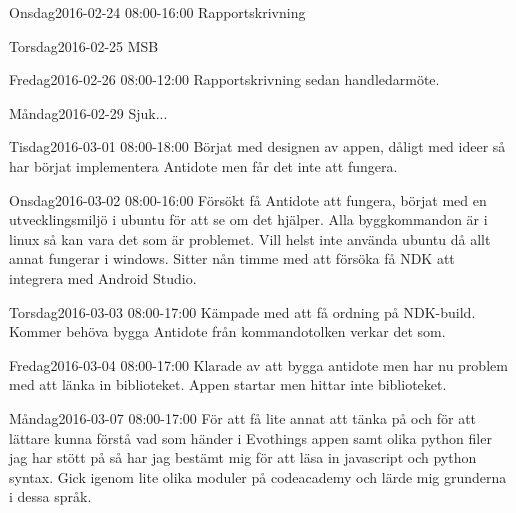 \documentclass[a4paper,oneside]{book}
\begin{document}
\begin{diary}{Onsdag}{2016-02-24 08:00-16:00}
	Rapportskrivning
\end{diary}

\begin{diary}{Torsdag}{2016-02-25}
	MSB
\end{diary}

\begin{diary}{Fredag}{2016-02-26 08:00-12:00}
	Rapportskrivning sedan handledarmöte.
\end{diary}
\newpage

\begin{diary}{Måndag}{2016-02-29}
	Sjuk...
\end{diary}

\begin{diary}{Tisdag}{2016-03-01 08:00-18:00}
	Börjat med designen av appen, dåligt med ideer så har börjat implementera Antidote men får det inte att fungera.
\end{diary}

\begin{diary}{Onsdag}{2016-03-02 08:00-16:00}
	Försökt få Antidote att fungera, börjat med en utvecklingsmiljö i ubuntu för att se om det hjälper. Alla byggkommandon är i linux så kan vara det som är problemet. Vill helst inte använda ubuntu då allt annat fungerar i windows. Sitter nån timme med att försöka få NDK att integrera med Android Studio.
\end{diary}

\begin{diary}{Torsdag}{2016-03-03 08:00-17:00}
	Kämpade med att få ordning på NDK-build. Kommer behöva bygga Antidote från kommandotolken verkar det som.
\end{diary}

\begin{diary}{Fredag}{2016-03-04 08:00-17:00}
	Klarade av att bygga antidote men har nu problem med att länka in biblioteket. Appen startar men hittar inte biblioteket.
\end{diary}
\newpage

\begin{diary}{Måndag}{2016-03-07 08:00-17:00}
	För att få lite annat att tänka på och för att lättare kunna förstå vad som händer i Evothings appen samt olika python filer jag har stött på så har jag bestämt mig för att läsa in javascript och python syntax. Gick igenom lite olika moduler på codeacademy och lärde mig grunderna i dessa språk.
\end{diary}
\end{document}
